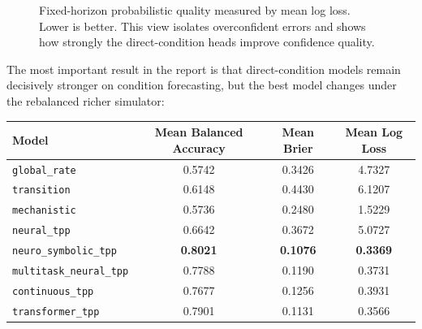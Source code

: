 \documentclass[11pt]{article}
\begin{document}
\begin{figure}[H]
\centering
{}
\caption{Fixed-horizon probabilistic quality measured by mean log loss. Lower is better. This view isolates overconfident errors and shows how strongly the direct-condition heads improve confidence quality.}
\label{fig:logloss}
\end{figure}

The most important result in the report is that direct-condition models remain decisively stronger on condition forecasting, but the best model changes under the rebalanced richer simulator:

\begin{center}
\begin{tabular}{lccc}
\toprule
Model & Mean Balanced Accuracy & Mean Brier & Mean Log Loss \\
\midrule
\texttt{global\_rate} & 0.5742 & 0.3426 & 4.7327 \\
\texttt{transition} & 0.6148 & 0.4430 & 6.1207 \\
\texttt{mechanistic} & 0.5736 & 0.2480 & 1.5229 \\
\texttt{neural\_tpp} & 0.6642 & 0.3672 & 5.0727 \\
\texttt{neuro\_symbolic\_tpp} & \textbf{0.8021} & \textbf{0.1076} & \textbf{0.3369} \\
\texttt{multitask\_neural\_tpp} & 0.7788 & 0.1190 & 0.3731 \\
\texttt{continuous\_tpp} & 0.7677 & 0.1256 & 0.3931 \\
\texttt{transformer\_tpp} & 0.7901 & 0.1131 & 0.3566 \\
\bottomrule
\end{tabular}
\end{center}
\end{document}
